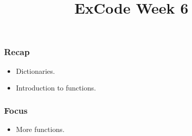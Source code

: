 \documentclass{beamer}
\title{ExCode Week 6}
\institute{University of Exeter}
\date{\displaydate{today}}
\begin{document}
\frame{\titlepage}

\begin{frame}
	\frametitle{Recap}

	\begin{itemize}
		\item{Dictionaries.}
		\item{Introduction to functions.}
	\end{itemize}
\end{frame}

\begin{frame}
	\frametitle{Focus}

	\begin{itemize}
		\item{More functions.}
	\end{itemize}
\end{frame}
\end{document}
